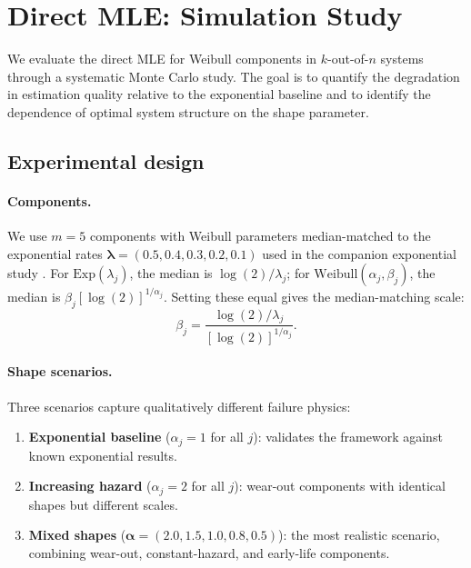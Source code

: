\documentclass[12pt]{article}
\theoremstyle{definition}
\theoremstyle{remark}
\newcommand{\balpha}{\boldsymbol{\alpha}}
\newcommand{\blam}{\boldsymbol{\lambda}}
\begin{document}
\section{Direct MLE: Simulation Study}
\label{sec:simulations}

We evaluate the direct MLE for Weibull components in $k$-out-of-$n$
systems through a systematic Monte Carlo study.  The goal is to
quantify the degradation in estimation quality relative to the
exponential baseline and to identify the dependence of optimal
system structure on the shape parameter.

\subsection{Experimental design}
\label{sec:sim-design}

\paragraph{Components.}
We use $m = 5$ components with Weibull parameters
median-matched to the exponential rates
$\blam = (0.5, 0.4, 0.3, 0.2, 0.1)$ used in the companion
exponential study \citep{Towell2026}.  For
$\mathrm{Exp}(\lambda_j)$, the median is
$\log(2)/\lambda_j$; for
$\mathrm{Weibull}(\alpha_j, \beta_j)$, the median is
$\beta_j [\log(2)]^{1/\alpha_j}$.  Setting these equal gives the
median-matching scale:
\begin{equation}\label{eq:median-match}
  \beta_j = \frac{\log(2)/\lambda_j}{[\log(2)]^{1/\alpha_j}}.
\end{equation}

\paragraph{Shape scenarios.}
Three scenarios capture qualitatively different failure physics:
\begin{enumerate}
\item \textbf{Exponential baseline} ($\alpha_j = 1$ for all $j$):
  validates the framework against known exponential results.
\item \textbf{Increasing hazard} ($\alpha_j = 2$ for all $j$):
  wear-out components with identical shapes but different scales.
\item \textbf{Mixed shapes}
  ($\balpha = (2.0, 1.5, 1.0, 0.8, 0.5)$): the most realistic
  scenario, combining wear-out, constant-hazard, and early-life
  components.
\end{enumerate}
\end{document}
